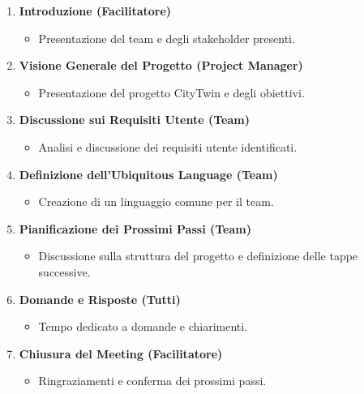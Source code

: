 \begin{enumerate}
    \item \textbf{Introduzione (Facilitatore)}
          \begin{itemize}
              \item Presentazione del team e degli stakeholder presenti.
          \end{itemize}

    \item \textbf{Visione Generale del Progetto (Project Manager)}
          \begin{itemize}
              \item Presentazione del progetto CityTwin e degli obiettivi.
          \end{itemize}

    \item \textbf{Discussione sui Requisiti Utente (Team)}
          \begin{itemize}
              \item Analisi e discussione dei requisiti utente identificati.
          \end{itemize}

    \item \textbf{Definizione dell'Ubiquitous Language (Team)}
          \begin{itemize}
              \item Creazione di un linguaggio comune per il team.
          \end{itemize}

    \item \textbf{Pianificazione dei Prossimi Passi (Team)}
          \begin{itemize}
              \item Discussione sulla struttura del progetto e definizione delle tappe successive.
          \end{itemize}

    \item \textbf{Domande e Risposte (Tutti)}
          \begin{itemize}
              \item Tempo dedicato a domande e chiarimenti.
          \end{itemize}

    \item \textbf{Chiusura del Meeting (Facilitatore)}
          \begin{itemize}
              \item Ringraziamenti e conferma dei prossimi passi.
          \end{itemize}
\end{enumerate}

